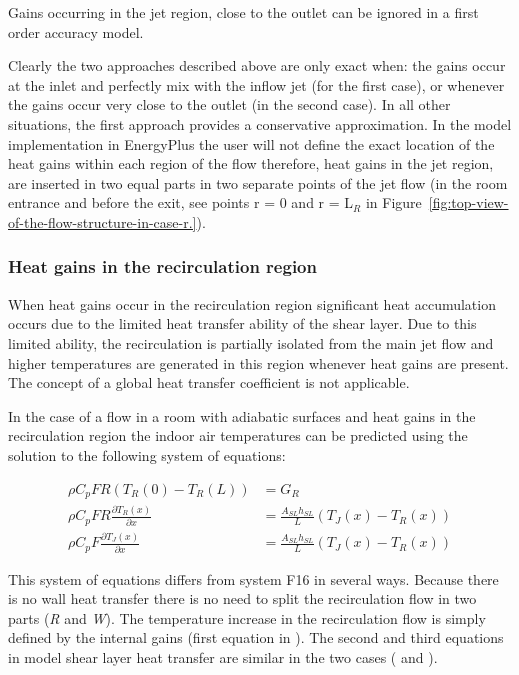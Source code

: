 Gains occurring in the jet region, close to the outlet can be ignored in a first order accuracy model.

Clearly the two approaches described above are only exact when: the gains occur at the inlet and perfectly mix with the inflow jet (for the first case), or whenever the gains occur very close to the outlet (in the second case). In all other situations, the first approach provides a conservative approximation. In the model implementation in EnergyPlus the user will not define the exact location of the heat gains within each region of the flow therefore, heat gains in the jet region, are inserted in two equal parts in two separate points of the jet flow (in the room entrance and before the exit, see points r = 0 and r = L\(_{R}\) in Figure~\ref{fig:top-view-of-the-flow-structure-in-case-r.}).

\subsubsection{Heat gains in the recirculation region}\label{heat-gains-in-the-recirculation-region}

When heat gains occur in the recirculation region significant heat accumulation occurs due to the limited heat transfer ability of the shear layer. Due to this limited ability, the recirculation is partially isolated from the main jet flow and higher temperatures are generated in this region whenever heat gains are present. The concept of a global heat transfer coefficient is not applicable.

In the case of a flow in a room with adiabatic surfaces and heat gains in the recirculation region the indoor air temperatures can be predicted using the solution to the following system of equations:

\begin{equation}
  \begin{array}{rl}
    \rho C_p F R \left(T_R\left(0\right) - T_R\left(L\right)\right) & = G_R \\
    \rho C_p F R \frac{\partial T_R \left(x\right)}{\partial x} & = \frac{A_{SL} h_{SL}}{L} \left(T_J\left(x\right) - T_R \left(x\right)\right) \\
    \rho C_p F \frac{\partial T_J \left(x\right)}{\partial x} & = \frac{A_{SL} h_{SL}}{L} \left(T_J\left(x\right) - T_R \left(x\right)\right)
  \end{array}
\end{equation}

This system of equations differs from system F16 in several ways. Because there is no wall heat transfer there is no need to split the recirculation flow in two parts (\emph{R} and \emph{W}). The temperature increase in the recirculation flow is simply defined by the internal gains (first equation in ). The second and third equations in model shear layer heat transfer are similar in the two cases ( and ).

